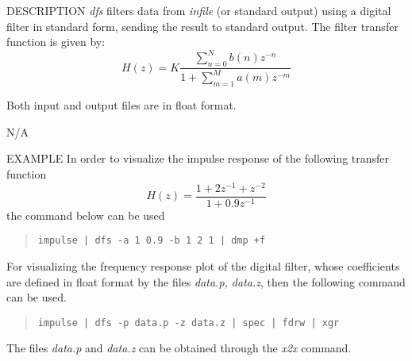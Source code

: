 \begin{synopsis}
\item[dfs] [ --a $K$ $a(1)$ $\dots$ $a(M)$ ] 
	   [ --b $b(0)$ $b(1)$ $\dots$ $b(N)$ ] 
	   [ --p {\em pfile} ] [ --z {\em zfile} ]
\item[\ ~~~] [ {\em infile} ]
\end{synopsis}

\begin{qsection}{DESCRIPTION}
{\em dfs} filters data from {\em infile} (or standard output) 
using a digital filter in standard form, 
sending the result to standard output.
  The filter transfer function is given by:
\begin{displaymath}
  H(z) 
  = 
  K\frac{\displaystyle{\sum_{n=0}^{N}{b(n)z^{-n}}}}{1+\displaystyle{\sum_{m=1}^{M}{a(m)z^{-m}}}}
\end{displaymath}
\par
Both input and output files are in float format.
\end{qsection}

\begin{options}
		{N/A}
\end{options}

\begin{qsection}{EXAMPLE}
In order to visualize the impulse response of the following transfer
 function
\begin{displaymath}
  H(z)=\frac{1+2z^{-1}+z^{-2}}{1+0.9z^{-1}}
\end{displaymath}
the command below can be used
\begin{quote}
 \verb!impulse | dfs -a 1 0.9 -b 1 2 1 | dmp +f!
\end{quote}
\par
For visualizing the frequency response plot of the digital filter,
whose coefficients are defined in float format by the files
{\em data.p, data.z}, then the following command can be used.
\begin{quote}
 \verb!impulse | dfs -p data.p -z data.z | spec | fdrw | xgr!
\end{quote}
The files {\em data.p} and {\em data.z} can be obtained
through the {\em x2x} command.
\end{qsection}
